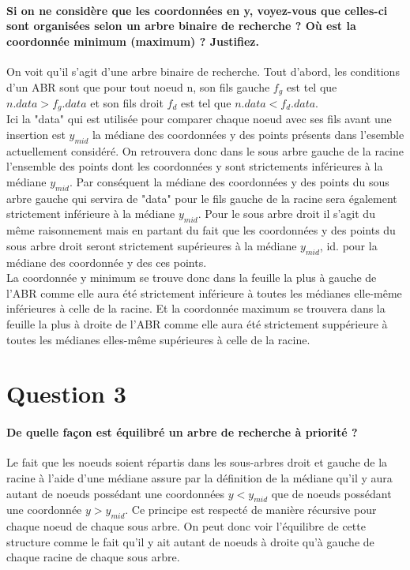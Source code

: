 \documentclass{article}
\begin{document}
    \paragraph{Si on ne considère que les coordonnées en y, voyez-vous que celles-ci sont organisées selon
    un arbre binaire de recherche ? Où est la coordonnée minimum (maximum) ? Justifiez.}
    On voit qu'il s'agit d'une arbre binaire de recherche. Tout d'abord, les conditions d'un ABR sont que pour tout noeud n, son fils gauche $f_g$ est 
    tel que $n.data > f_g.data$ et son fils droit $f_d$ est tel que $n.data < f_d.data$. \\
    Ici la "data" qui est utilisée pour comparer chaque noeud avec ses fils avant une insertion est $y_{mid}$ la médiane des coordonnées y des points
    présents dans l'esemble actuellement considéré. On retrouvera donc dans le sous arbre gauche de la racine l'ensemble des points dont les coordonnées
    y sont strictements inférieures à la médiane $y_{mid}$. Par conséquent la médiane des coordonnées y des points du sous arbre gauche qui servira
    de "data" pour le fils gauche de la racine sera également strictement inférieure à la médiane $y_{mid}$. Pour le sous arbre droit il s'agit du même raisonnement
    mais en partant du fait que les coordonnées y des points du sous arbre droit seront strictement supérieures à la médiane $y_{mid}$, id. pour la médiane des coordonnée
    y des ces points. \\
    La coordonnée y minimum se trouve donc dans la feuille la plus à gauche de l'ABR comme elle aura été strictement inférieure à toutes les médianes elle-même inférieures
    à celle de la racine. Et la coordonnée maximum se trouvera dans la feuille la plus à droite de l'ABR comme elle aura été strictement suppérieure à toutes
    les médianes elles-même supérieures à celle de la racine.

\newpage
\section{Question 3}
    \paragraph{De quelle façon est équilibré un arbre de recherche à priorité ?}
    Le fait que les noeuds soient répartis dans les sous-arbres droit et gauche de la racine à l'aide d'une médiane assure par la définition de
    la médiane qu'il y aura autant de noeuds possédant une coordonnées $y < y_{mid}$ que de noeuds possédant une coordonnée $y > y_{mid}$.
    Ce principe est respecté de manière récursive pour chaque noeud de chaque sous arbre. On peut donc voir l'équilibre de cette structure comme le fait
    qu'il y ait autant de noeuds à droite qu'à gauche de chaque racine de chaque sous arbre.
\end{document}
